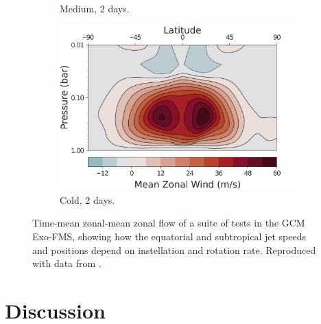 \begin{figure}
\begin{subfigure}[b]{0.32\textwidth}
       \caption{Medium, 2 days.}
     \end{subfigure}
     \begin{subfigure}[b]{0.32\textwidth}
       \includegraphics[width=\textwidth]{figures/eqm-zonal-flow/wind-cold-2.pdf}
       \caption{Cold, 2 days.}
     \end{subfigure}
  \caption{Time-mean zonal-mean zonal flow of a suite of tests in the GCM Exo-FMS, showing how the equatorial and subtropical jet speeds and positions depend on instellation and rotation rate. Reproduced with data from \citet{pierrehumbert2018review}.}
  \label{fig:gcm-suite-jets}
\end{figure}

%





\section{Discussion}

